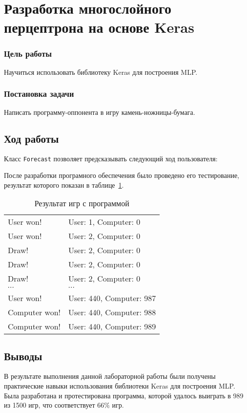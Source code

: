 



\newcommand{\labnumber}{5}



\graphicspath{{figures/}}


\Russian


\addtocounter{page}{1}

\section*{Разработка многослойного перцептрона на основе Keras}
\subsubsection*{Цель работы}
Научиться использовать библиотеку Keras для построения MLP.
\subsubsection*{Постановка задачи}
Написать программу-оппонента в игру камень-ножницы-бумага.

\subsection*{Ход работы}
Класс \texttt{Forecast} позволяет предсказывать следующий ход пользователя:


После разработки програмного обеспечения было проведено его тестирование, результат которого показан в таблице~\ref{tab:result}.

\begin{table}[H]
  \caption{Результат игр с программой}
  \begin{tabular}{l|l}
  	User won! & User: 1, Computer: 0 \\
	User won! & User: 2, Computer: 0 \\
	Draw! & User: 2, Computer: 0 \\
	Draw! & User: 2, Computer: 0 \\
	Draw! & User: 2, Computer: 0 \\
    $\cdots$ & $\cdots$ \\
	User won! & User: 440, Computer: 987 \\
	Computer won! & User: 440, Computer: 988 \\
	Computer won! & User: 440, Computer: 989 \\
  \end{tabular}
  \label{tab:result}
\end{table}

\subsection*{Выводы}
В результате выполнения данной лабораторной работы были получены практические навыки использования библиотеки Keras для построения MLP.
Была разработана и протестирована программа, которой удалось выиграть в 989 из 1500 игр, что соответствует 66\% игр.


